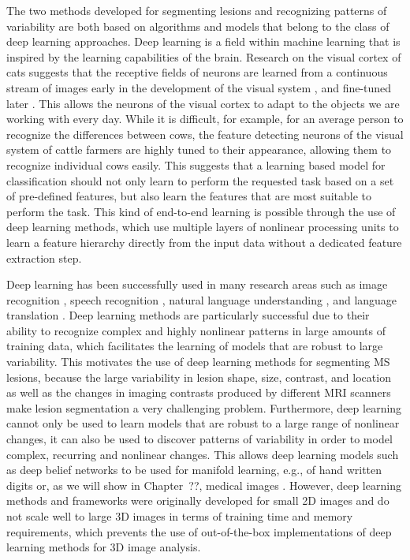 The two methods developed for segmenting lesions and recognizing patterns of
variability are both based on algorithms and models that belong to the class of
deep learning approaches. Deep learning is a field within machine learning that
is inspired by the learning capabilities of the brain. Research on the visual
cortex of cats suggests that the receptive fields of neurons are learned from a
continuous stream of images early in the development of the visual system
\citep{wiesel1963}, and fine-tuned later \citep{karni1991}. This allows the
neurons of the visual cortex to adapt to the objects we are working with every
day. While it is difficult, for example, for an average person to recognize the
differences between cows, the feature detecting neurons of the visual system of
cattle farmers are highly tuned to their appearance, allowing them to recognize
individual cows easily. This suggests that a learning based model for
classification should not only learn to perform the requested task based on a
set of pre-defined features, but also learn the features that are most
suitable to perform the task. This kind of end-to-end learning is possible
through the use of deep learning methods, which use multiple layers of nonlinear
processing units to learn a feature hierarchy directly from the input data
without a dedicated feature extraction step.

Deep learning has been successfully used in many research areas such as image
recognition \citep{krizhevsky2012}, speech recognition \citep{hinton2012deep},
natural language understanding \citep{collobert2011natural}, and language
translation \citep{sutskever2014sequence}. Deep learning methods are
particularly successful due to their ability to recognize complex and highly
nonlinear patterns in large amounts of training data, which facilitates the
learning of models that are robust to large variability. This motivates the use
of deep learning methods for segmenting MS lesions, because the large
variability in lesion shape, size, contrast, and location as well as the changes
in imaging contrasts produced by different MRI scanners make lesion segmentation
a very challenging problem. Furthermore, deep learning cannot only be used
to learn models that are robust to a large range of nonlinear changes, it can
also be used to discover patterns of variability in order to model complex,
recurring and nonlinear changes. This allows deep learning models such as deep
belief networks to be used for manifold learning, e.g., of hand written digits
\citep{hinton2006b} or, as we will show in Chapter~??, medical images
\citep{brosch2013}. However, deep learning methods and frameworks
were originally developed for small 2D images and do not scale well to large 3D
images in terms of training time and memory requirements, which prevents the use
of out-of-the-box implementations of deep learning methods for 3D image
analysis.

